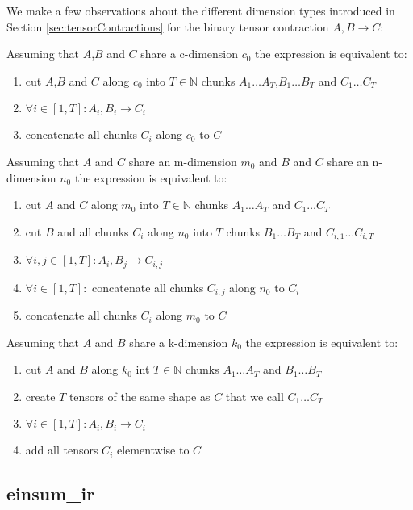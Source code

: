 We make a few observations about the different dimension types introduced in Section \ref{sec:tensorContractions} for the binary tensor contraction $A,B \rightarrow C$:

Assuming that $A$,$B$ and $C$ share a c-dimension $c_0$ the expression is equivalent to:
\begin{enumerate}
  \item cut $A$,$B$ and $C$ along $c_0$ into $T \in \mathbb{N}$ chunks $A_1 \dots A_T$,$B_1 \dots B_T$ and $C_1 \dots C_T$
  \item $\forall i \in [1,T]: A_i, B_i \rightarrow C_i$
  \item concatenate all chunks $C_i$ along $c_0$ to $C$
\end{enumerate}

Assuming that $A$ and $C$ share an m-dimension $m_0$ and $B$ and $C$ share an n-dimension $n_0$ the expression is equivalent to:
\begin{enumerate}
  \item cut $A$ and $C$ along $m_0$ into $T \in \mathbb{N}$ chunks $A_1 \dots A_T$ and $C_1 \dots C_T$
  \item cut $B$ and all chunks $C_i$ along $n_0$ into $T$ chunks $B_1 \dots B_T$ and $C_{i,1} \dots C_{i,T}$
  \item $\forall i,j \in [1,T]: A_i, B_j \rightarrow C_{i,j}$
  \item $\forall i \in [1,T]:$ concatenate all chunks $C_{i,j}$ along $n_0$ to $C_i$
  \item concatenate all chunks $C_i$ along $m_0$ to $C$
\end{enumerate}

Assuming that $A$ and $B$ share a k-dimension $k_0$ the expression is equivalent to:
\begin{enumerate}
  \item cut $A$ and $B$ along $k_0$ int $T \in \mathbb{N}$ chunks $A_1 \dots A_T$ and $B_1 \dots B_T$
  \item create $T$ tensors of the same shape as $C$ that we call $C_1 \dots C_T$
  \item $\forall i \in [1,T]: A_i, B_i \rightarrow C_i$
  \item add all tensors $C_i$ elementwise to $C$
\end{enumerate}


\subsection{einsum\_ir}
\label{sec:einsum_ir}

